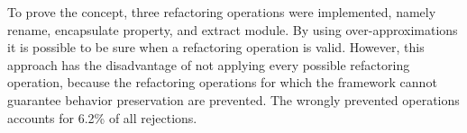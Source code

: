 To prove the concept, three refactoring operations were implemented,
namely rename, encapsulate property, and extract module.  By using
over-approximations it is possible to be sure when a refactoring
operation is valid.  However, this approach has the disadvantage of
not applying every possible refactoring operation, because the
refactoring operations for which the framework cannot guarantee
behavior preservation are prevented.  The wrongly prevented operations
accounts for 6.2\% of all rejections.
